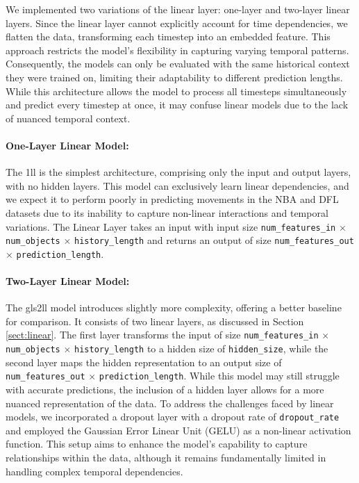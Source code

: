 We implemented two variations of the linear layer: one-layer and two-layer linear layers. Since the linear layer cannot explicitly account for time dependencies, we flatten the data, transforming each timestep into an embedded feature. This approach restricts the model's flexibility in capturing varying temporal patterns. Consequently, the models can only be evaluated with the same historical context they were trained on, limiting their adaptability to different prediction lengths. While this architecture allows the model to process all timesteps simultaneously and predict every timestep at once, it may confuse linear models due to the lack of nuanced temporal context.

\paragraph{One-Layer Linear Model:}
\label{sec:1ll-details}
The \gls{1ll} is the simplest architecture, comprising only the input and output layers, with no hidden layers. This model can exclusively learn linear dependencies, and we expect it to perform poorly in predicting movements in the NBA and DFL datasets due to its inability to capture non-linear interactions and temporal variations. The Linear Layer takes an input with input size \texttt{num\_features\_in} $\times$ \texttt{num\_objects} $\times$ \texttt{history\_length} and returns an output of size \texttt{num\_features\_out} $\times$ \texttt{prediction\_length}.

\paragraph{Two-Layer Linear Model:}
\label{sec:2ll-details}
The gls{2ll} model introduces slightly more complexity, offering a better baseline for comparison. It consists of two linear layers, as discussed in Section \ref{sect:linear}. The first layer transforms the input of size \texttt{num\_features\_in} $\times$ \texttt{num\_objects} $\times$ \texttt{history\_length} to a hidden size of \texttt{hidden\_size}, while the second layer maps the hidden representation to an output size of \texttt{num\_features\_out} $\times$ \texttt{prediction\_length}. While this model may still struggle with accurate predictions, the inclusion of a hidden layer allows for a more nuanced representation of the data. To address the challenges faced by linear models, we incorporated a dropout layer with a dropout rate of \texttt{dropout\_rate} and employed the Gaussian Error Linear Unit (GELU) as a non-linear activation function. This setup aims to enhance the model's capability to capture relationships within the data, although it remains fundamentally limited in handling complex temporal dependencies.


